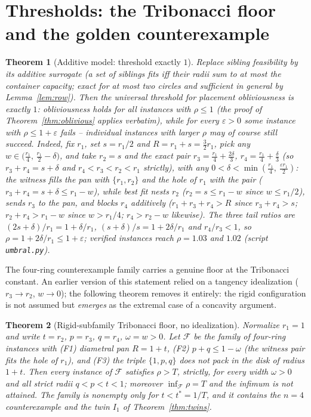 \documentclass[11pt]{article}
\newtheorem{theorem}{Theorem}
\theoremstyle{definition}
\begin{document}
\section{Thresholds: the Tribonacci floor and the golden counterexample}
\label{sec:threshold}

\begin{theorem}[Additive model: threshold exactly $1$]\label{thm:additive}
Replace sibling feasibility by its additive surrogate (a set of siblings fits
iff their radii sum to at most the container capacity; exact for at most two
circles and sufficient in general by Lemma~\ref{lem:row}). Then the
\emph{universal} threshold for placement obliviousness is exactly $1$:
obliviousness holds for \emph{all} instances with $\rho\le1$ (the proof of
Theorem~\ref{thm:oblivious} applies verbatim), while for every
$\varepsilon>0$ \emph{some} instance with $\rho\le1+\varepsilon$ fails --
individual instances with larger $\rho$ may of course still succeed.
Indeed, fix $r_1$, set $s=r_1/2$ and $R=r_1+s=\tfrac32r_1$, pick any
$w\in\bigl(\tfrac{r_1}4,\,\tfrac{r_1}2-\delta\bigr)$, and take $r_2=s$
and the exact pair
$r_3=\tfrac{r_1}4+\tfrac{2\delta}3$, $r_4=\tfrac{r_1}4+\tfrac\delta3$
(so $r_3+r_4=s+\delta$ and $r_4<r_3<r_2<r_1$ strictly), with any
$0<\delta<\min(\tfrac{r_1}4,\ \tfrac{\varepsilon r_1}2)$: the witness
fills the pan with $\{r_1,r_2\}$ and
the hole of $r_1$ with the pair ($r_3+r_4=s+\delta\le r_1-w$), while
best fit nests $r_2$ ($r_2=s\le r_1-w$ since $w\le r_1/2$), sends $r_3$
to the pan, and blocks $r_4$ additively ($r_1+r_3+r_4>R$ since
$r_3+r_4>s$; $r_2+r_4>r_1-w$ since $w>r_1/4$; $r_4>r_2-w$ likewise).
The three tail ratios are $(2s+\delta)/r_1=1+\delta/r_1$,
$(s+\delta)/s=1+2\delta/r_1$ and $r_4/r_3<1$, so
$\rho=1+2\delta/r_1\le1+\varepsilon$; verified instances reach
$\rho=1.03$ and $1.02$ (script \texttt{umbral.py}).
\end{theorem}

The four-ring counterexample family carries a genuine floor at the Tribonacci
constant. An earlier version of this statement relied on a tangency
idealization ($r_3\to r_2$, $w\to0$); the following theorem removes it
entirely: the rigid configuration is not assumed but \emph{emerges} as the
extremal case of a concavity argument.

\begin{theorem}[Rigid-subfamily Tribonacci floor, no idealization]
\label{thm:rigidfloor}
Normalize $r_1=1$ and write $t=r_2$, $p=r_3$, $q=r_4$, $\omega=w>0$.
Let $\mathcal F$ be the family of four-ring instances with
\textup{(F1)} diametral pan $R=1+t$,
\textup{(F2)} $p+q\le 1-\omega$ (the witness pair fits the hole of $r_1$), and
\textup{(F3)} the triple $\{1,p,q\}$ does not pack in the disk of radius
$1+t$. Then every instance of $\mathcal F$ satisfies $\rho>T$, strictly, for
every width $\omega>0$ and all strict radii $q<p<t<1$; moreover
$\inf_{\mathcal F}\rho=T$ and the infimum is not attained. The family is
nonempty only for $t<t^{*}=1/T$, and it contains the $n=4$ counterexample and
the twin $I_1$ of Theorem~\ref{thm:twins}.
\end{theorem}
\end{document}
